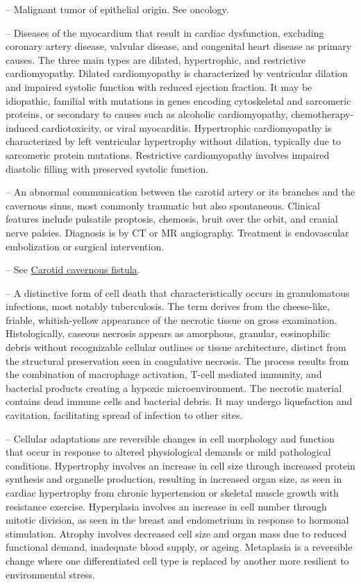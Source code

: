 -- Malignant tumor of epithelial origin. See oncology.

-- Diseases of the myocardium that result in cardiac dysfunction, excluding coronary artery disease, valvular disease, and congenital heart disease as primary causes. The three main types are dilated, hypertrophic, and restrictive cardiomyopathy. Dilated cardiomyopathy is characterized by ventricular dilation and impaired systolic function with reduced ejection fraction. It may be idiopathic, familial with mutations in genes encoding cytoskeletal and sarcomeric proteins, or secondary to causes such as alcoholic cardiomyopathy, chemotherapy-induced cardiotoxicity, or viral myocarditis. Hypertrophic cardiomyopathy is characterized by left ventricular hypertrophy without dilation, typically due to sarcomeric protein mutations. Restrictive cardiomyopathy involves impaired diastolic filling with preserved systolic function.

-- An abnormal communication between the carotid artery or its branches and the cavernous sinus, most commonly traumatic but also spontaneous. Clinical features include pulsatile proptosis, chemosis, bruit over the orbit, and cranial nerve palsies. Diagnosis is by CT or MR angiography. Treatment is endovascular embolization or surgical intervention.

-- See \hyperlink{Carotid cavernous fistula}{Carotid cavernous fistula}.

-- A distinctive form of cell death that characteristically occurs in granulomatous infections, most notably tuberculosis. The term derives from the cheese-like, friable, whitish-yellow appearance of the necrotic tissue on gross examination. Histologically, caseous necrosis appears as amorphous, granular, eosinophilic debris without recognizable cellular outlines or tissue architecture, distinct from the structural preservation seen in coagulative necrosis. The process results from the combination of macrophage activation, T-cell mediated immunity, and bacterial products creating a hypoxic microenvironment. The necrotic material contains dead immune cells and bacterial debris. It may undergo liquefaction and cavitation, facilitating spread of infection to other sites.

-- Cellular adaptations are reversible changes in cell morphology and function that occur in response to altered physiological demands or mild pathological conditions. Hypertrophy involves an increase in cell size through increased protein synthesis and organelle production, resulting in increased organ size, as seen in cardiac hypertrophy from chronic hypertension or skeletal muscle growth with resistance exercise. Hyperplasia involves an increase in cell number through mitotic division, as seen in the breast and endometrium in response to hormonal stimulation. Atrophy involves decreased cell size and organ mass due to reduced functional demand, inadequate blood supply, or ageing. Metaplasia is a reversible change where one differentiated cell type is replaced by another more resilient to environmental stress.

